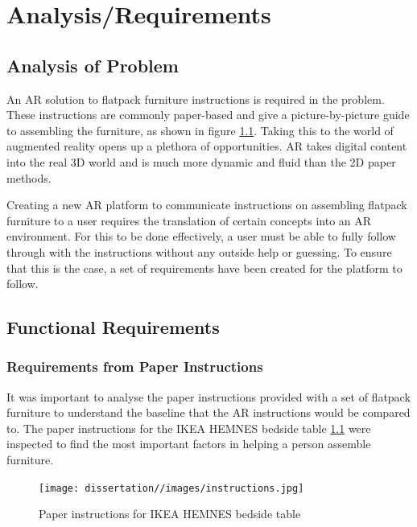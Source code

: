 \documentclass{l4proj}
\begin{document}
\chapter{Analysis/Requirements}

\section{Analysis of Problem}

An AR solution to flatpack furniture instructions is required in the problem. These instructions are commonly paper-based and give a picture-by-picture guide to assembling the furniture, as shown in figure \ref{fig:instructions}. Taking this to the world of augmented reality opens up a plethora of opportunities. AR takes digital content into the real 3D world and is much more dynamic and fluid than the 2D paper methods.

Creating a new AR platform to communicate instructions on assembling flatpack furniture to a user requires the translation of certain concepts into an AR environment. For this to be done effectively, a user must be able to fully follow through with the instructions without any outside help or guessing. To ensure that this is the case, a set of requirements have been created for the platform to follow.

\section{Functional Requirements}

\subsection{Requirements from Paper Instructions}

It was important to analyse the paper instructions provided with a set of flatpack furniture to understand the baseline that the AR instructions would be compared to. The paper instructions for the IKEA HEMNES bedside table \ref{fig:instructions} were inspected to find the most important factors in helping a person assemble furniture.

\begin{figure}[hbt!]
    \centering
    \texttt{[image: dissertation//images/instructions.jpg]}
    \caption{Paper instructions for IKEA HEMNES bedside table}
    \label{fig:instructions}
\end{figure}
\end{document}
